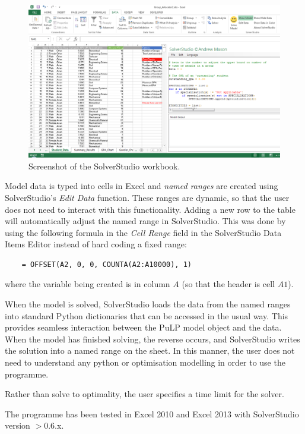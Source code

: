 \documentclass[12pt]{ORSNZ}
\begin{document}
\begin{figure}[!ht]
	\centering
	\includegraphics[width=\textwidth]{solverstudio_screenshot.pdf}
	\caption{Screenshot of the SolverStudio workbook.}
	\label{FIG:solverstudio_screen}
\end{figure}

Model data is typed into cells in Excel and \emph{named ranges} are created using SolverStudio's \emph{Edit Data} function. These ranges are dynamic, so that the user does not need to interact with this functionality. Adding a new row to the table will automatically adjust the named range in SolverStudio. This was done by using the following formula in the \emph{Cell Range} field in the SolverStudio Data Items Editor instead of hard coding a fixed range:

\begin{verbatim}
	= OFFSET(A2, 0, 0, COUNTA(A2:A10000), 1)
\end{verbatim}

where the variable being created is in column $A$ (so that the header is cell $A1$).

When the model is solved, SolverStudio loads the data from the named ranges into standard Python dictionaries that can be accessed in the usual way. This provides seamless interaction between the PuLP model object and the data. When the model has finished solving, the reverse occurs, and SolverStudio writes the solution into a named range on the sheet. In this manner, the user does not need to understand any python or optimisation modelling in order to use the programme.

Rather than solve to optimality, the user specifies a time limit for the solver.

The programme has been tested in Excel 2010 and Excel 2013 with SolverStudio version $>$0.6.x.
\end{document}
